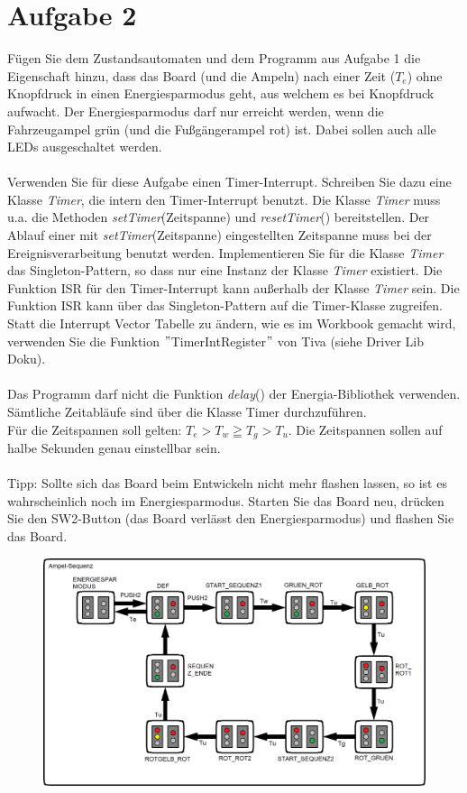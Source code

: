 \section{Aufgabe 2}
Fügen Sie dem Zustandsautomaten und dem Programm aus Aufgabe 1 die Eigenschaft hinzu, dass das Board (und die Ampeln) nach einer Zeit ($T_e$) ohne Knopfdruck in einen Energiesparmodus geht, aus welchem es bei Knopfdruck aufwacht. Der Energiesparmodus darf nur erreicht werden, wenn die Fahrzeugampel grün (und die Fu\ss{}gängerampel rot) ist. Dabei sollen auch alle LEDs ausgeschaltet werden.\\ \\
Verwenden Sie für diese Aufgabe einen Timer-Interrupt. Schreiben Sie dazu eine Klasse \textit{Timer}, die intern den Timer-Interrupt benutzt. Die Klasse \textit{Timer} muss u.a. die Methoden \textit{setTimer}(Zeitspanne) und \textit{resetTimer}() bereitstellen. Der Ablauf einer mit \textit{setTimer}(Zeitspanne) eingestellten Zeitspanne muss bei der Ereignisverarbeitung benutzt werden. Implementieren Sie für die Klasse \textit{Timer} das Singleton-Pattern, so dass nur eine Instanz der Klasse \textit{Timer} existiert. Die Funktion ISR für den Timer-Interrupt kann au\ss{}erhalb der Klasse \textit{Timer} sein. Die Funktion ISR kann über das Singleton-Pattern auf die Timer-Klasse zugreifen.\\
Statt die Interrupt Vector Tabelle zu ändern, wie es im Workbook gemacht wird, verwenden Sie die Funktion $"$TimerIntRegister$"$ von Tiva (siehe Driver Lib Doku).\\ \\
Das Programm darf nicht die Funktion \textit{delay}() der Energia-Bibliothek verwenden. Sämtliche Zeitabläufe sind über die Klasse Timer durchzuführen.\\
Für die Zeitspannen soll gelten: $T_e > T_w \geqq T_g > T_u$. Die Zeitspannen sollen auf halbe Sekunden genau einstellbar sein.\\ \\
Tipp: Sollte sich das Board beim Entwickeln nicht mehr flashen lassen, so ist es wahrscheinlich noch im Energiesparmodus. Starten Sie das Board neu, drücken Sie den SW2-Button (das Board verlässt den Energiesparmodus) und flashen Sie das Board.\\
\begin{figure}[h]
	\centering
	\includegraphics[width=0.7\linewidth]{images/Statechart2}
\end{figure}
